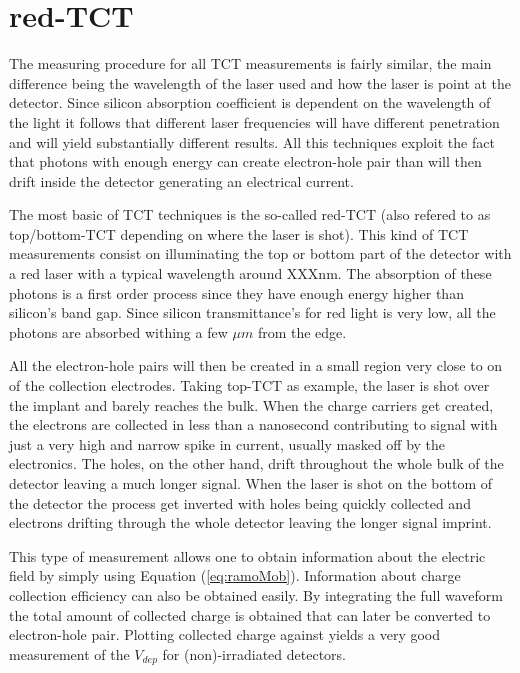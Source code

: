 \section{red-TCT} %
\label{sec:experimental_method}

The measuring procedure for all TCT measurements is fairly similar, the main difference being the wavelength of the laser used and how the laser is point at the detector. Since silicon absorption coefficient is dependent on the wavelength of the light it follows that different laser frequencies will have different penetration and will yield substantially different results. All this techniques exploit the fact that photons with enough energy can create electron-hole pair than will then drift inside the detector generating an electrical current. 

The most basic of TCT techniques is the so-called red-TCT (also refered to as top/bottom-TCT depending on where the laser is shot). This kind of TCT measurements consist on illuminating the top or bottom part of the detector with a red laser with a typical wavelength around XXXnm. The absorption of these photons is a first order process since they have enough energy higher than silicon's band gap. Since silicon transmittance's for red light is very low, all the photons are absorbed withing a few $\mu m$ from the edge. 

All the electron-hole pairs will then be created in a small region very close to on of the collection electrodes. Taking top-TCT as example, the laser is shot over the implant and barely reaches the bulk. When the charge carriers get created, the electrons are collected in less than a nanosecond contributing to signal with just a very high and narrow spike in current, usually masked off by the electronics. The holes, on the other hand, drift throughout the whole bulk of the detector leaving a much longer signal. When the laser is shot on the bottom of the detector the process get inverted with holes being quickly collected and electrons drifting through the whole detector leaving the longer signal imprint.

This type of measurement allows one to obtain information about the electric field by simply using Equation (\ref{eq:ramoMob}). Information about charge collection efficiency can also be obtained easily. By integrating the full waveform the total amount of collected charge is obtained that can later be converted to electron-hole pair. Plotting collected charge against \vias yields a very good measurement of the $V_{dep}$ for (non)-irradiated detectors. 

